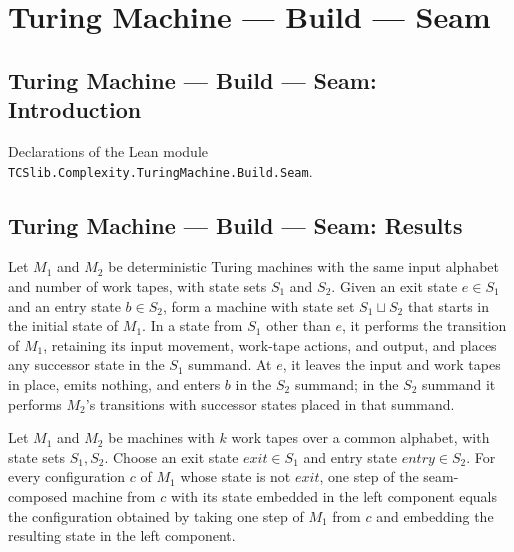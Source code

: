 \section{Turing Machine --- Build --- Seam}
\subsection*{Turing Machine --- Build --- Seam: Introduction}

Declarations of the Lean module \texttt{TCSlib.Complexity.TuringMachine.Build.Seam}.

\subsection*{Turing Machine --- Build --- Seam: Results}

\begin{definition}
\label{Turing.seamCompTM}
\leanok
{}
Let $M_1$ and $M_2$ be deterministic Turing machines with the same input alphabet and
number of work tapes, with state sets $S_1$ and $S_2$. Given an exit state $e\in S_1$
and an entry state $b\in S_2$, form a machine with state set $S_1\sqcup S_2$ that starts
in the initial state of $M_1$. In a state from $S_1$ other than $e$, it performs the
transition of $M_1$, retaining its input movement, work-tape actions, and output, and
places any successor state in the $S_1$ summand. At $e$, it leaves the input and work
tapes in place, emits nothing, and enters $b$ in the $S_2$ summand; in the $S_2$ summand
it performs $M_2$'s transitions with successor states placed in that summand.
\end{definition}

\begin{lemma}
\label{Turing.seamComp_step_left}
\leanok
{}
Let $M_1$ and $M_2$ be machines with $k$ work tapes over a common alphabet, with state
sets $S_1,S_2$. Choose an exit state $exit\in S_1$ and entry state $entry\in S_2$. For
every configuration $c$ of $M_1$ whose state is not $exit$, one step of the
seam-composed machine from $c$ with its state embedded in the left component equals the
configuration obtained by taking one step of $M_1$ from $c$ and embedding the resulting
state in the left component.
\end{lemma}

